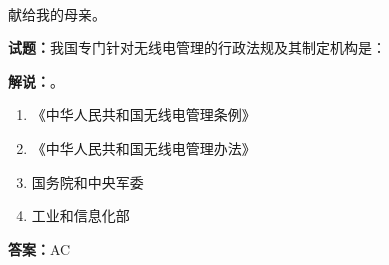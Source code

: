 \documentclass{ctexbook}
\newcommand{\reponame}{mike2718/ham}    %
\newcommand{\commiturl}{\url{https://github.com/\reponame/commit/\commithash}}
\begin{document}

\title{}
\author{\large \texttt{BG7XTQ}编著}
\date{\large{日期：\texttt{\today}}
  \vspace{15em}
  \\使用 
  \\编译自提交 \texttt{\commiturl}
}

\maketitle

\thispagestyle{empty}
\vfil
\ \\
\vspace{15em}
\begin{center}
  {\Large 献给我的母亲。}
\end{center}


\newpage
\tableofcontents











\textbf{试题：}我国专门针对无线电管理的行政法规及其制定机构是： 

\noindent\textbf{解说：}。

\begin{enumerate}[leftmargin=3em]
  \item 《中华人民共和国无线电管理条例》 

  \item 《中华人民共和国无线电管理办法》 

  \item 国务院和中央军委 

  \item 工业和信息化部 

\end{enumerate}

\textbf{答案：}AC 





\vspace{1em}
\end{document}
